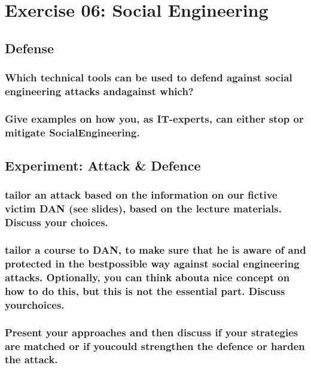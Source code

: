 \section{Exercise 06: Social Engineering}

\subsection{Defense}
\subsubsection{Which technical tools can be used to defend against social engineering attacks andagainst which?}
\subsubsection{Give examples on how you, as IT-experts, can either stop or mitigate SocialEngineering.}

\subsection{Experiment: Attack \& Defence}
\subsubsection{tailor an attack based on the information on our fictive victim DAN (see slides), based on the lecture materials. Discuss your choices.}
\subsubsection{tailor a course to DAN, to make sure that he is aware of and protected in the bestpossible way against social engineering attacks. Optionally, you can think abouta nice concept on how to do this, but this is not the essential part. Discuss yourchoices.}
\subsubsection{Present your approaches and then discuss if your strategies are matched or if youcould strengthen the defence or harden the attack.}